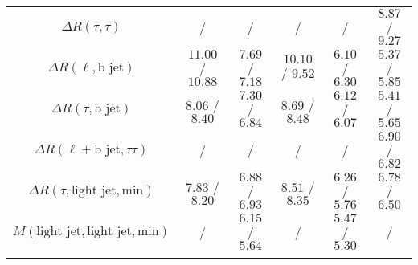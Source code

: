 \begin{tabular}{cccccc}
$\Delta R(\tau,\tau)$ &  / &  / &  / &  / & $8.87$ / $9.27$\\
$\Delta R(\ell,\text{b~jet})$ & $11.00$ / $10.88$ & $7.69$ / $7.18$ & $10.10$ / $9.52$ & $6.10$ / $6.30$ & $5.37$ / $5.85$\\
$\Delta R(\tau,\text{b~jet})$ & $8.06$ / $8.40$ & $7.30$ / $6.84$ & $8.69$ / $8.48$ & $6.12$ / $6.07$ & $5.41$ / $5.65$\\
$\Delta R(\ell+\text{b~jet},\tau\tau )$ &  / &  / &  / &  / & $6.90$ / $6.82$\\
$\Delta R(\tau,\text{light~jet},\text{min})$ & $7.83$ / $8.20$ & $6.88$ / $6.93$ & $8.51$ / $8.35$ & $6.26$ / $5.76$ & $6.78$ / $6.50$\\
$M(\text{light~jet},\text{light~jet},\text{min})$ &  / & $6.15$ / $5.64$ &  / & $5.47$ / $5.30$ &  /\\
\bottomrule\bottomrule\\
\end{tabular}


